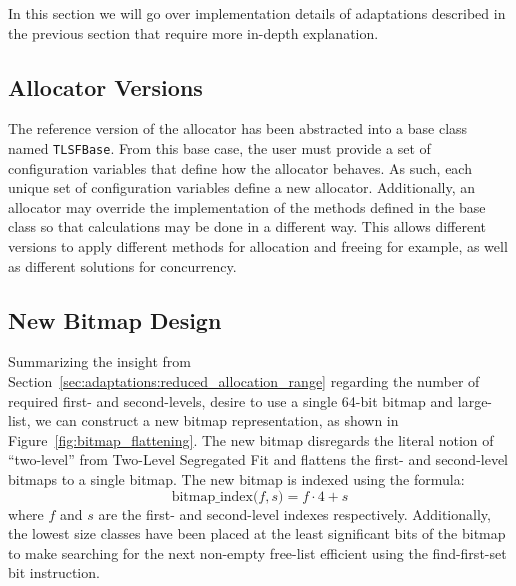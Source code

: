 
In this section we will go over implementation details of adaptations described in the previous section that require more in-depth explanation.

\subsection{Allocator Versions}

The reference version of the allocator has been abstracted into a base class named \texttt{TLSFBase}. From this base case, the user must provide a set of configuration variables that define how the allocator behaves. As such, each unique set of configuration variables define a new allocator. Additionally, an allocator may override the implementation of the methods defined in the base class so that calculations may be done in a different way. This allows different versions to apply different methods for allocation and freeing for example, as well as different solutions for concurrency.

\subsection{New Bitmap Design}

Summarizing the insight from Section~\ref{sec:adaptations:reduced_allocation_range} regarding the number of required first- and second-levels, desire to use a single 64-bit bitmap and large-list, we can construct a new bitmap representation, as shown in Figure~\ref{fig:bitmap_flattening}. The new bitmap disregards the literal notion of ``two-level'' from Two-Level Segregated Fit and flattens the first- and second-level bitmaps to a single bitmap. The new bitmap is indexed using the formula: 
\[
    \text{bitmap\_index($f, s$)} = f \cdot 4 + s
\]
where $f$ and $s$ are the first- and second-level indexes respectively. Additionally, the lowest size classes have been placed at the least significant bits of the bitmap to make searching for the next non-empty free-list efficient using the find-first-set bit instruction.

